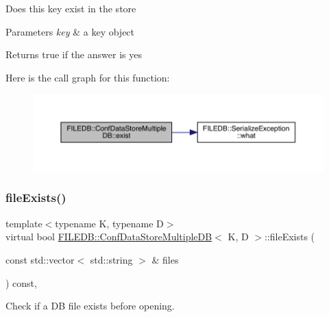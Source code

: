 Does this key exist in the store 
\begin{DoxyParams}{Parameters}
{\em key} & a key object \\
\hline
\end{DoxyParams}
\begin{DoxyReturn}{Returns}
true if the answer is yes 
\end{DoxyReturn}
Here is the call graph for this function\+:
\nopagebreak
\begin{figure}[H]
\begin{center}
\leavevmode
\includegraphics[width=350pt]{d3/dc0/classFILEDB_1_1ConfDataStoreMultipleDB_ad80312a9a4767f3b0b567932542d3ee7_cgraph}
\end{center}
\end{figure}
\mbox{\label{classFILEDB_1_1ConfDataStoreMultipleDB_a85c71818db3a3b0a5a67b4dabaed2ff7}} 
\subsubsection{\texorpdfstring{fileExists()}{fileExists()}\hspace{0.1cm}{\footnotesize\ttfamily [1/3]}}
{\footnotesize\ttfamily template$<$typename K, typename D$>$ \\
virtual bool \mbox{\hyperlink{classFILEDB_1_1ConfDataStoreMultipleDB}{F\+I\+L\+E\+D\+B\+::\+Conf\+Data\+Store\+Multiple\+DB}}$<$ K, D $>$\+::file\+Exists (\begin{DoxyParamCaption}\item[{const std\+::vector$<$ std\+::string $>$ \&}]{files }\end{DoxyParamCaption}) const\hspace{0.3cm}{\ttfamily [inline]}, {\ttfamily [virtual]}}

Check if a DB file exists before opening. \mbox{\label{classFILEDB_1_1ConfDataStoreMultipleDB_a85c71818db3a3b0a5a67b4dabaed2ff7}} 
